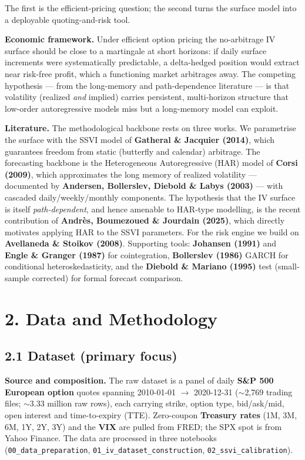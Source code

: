 \documentclass[10pt,a4paper]{article}
\begin{document}
The first is the efficient-pricing question; the second turns the surface model into a deployable quoting-and-risk tool.

\textbf{Economic framework.} Under efficient option pricing the no-arbitrage IV surface should be close to a martingale at short horizons: if daily surface increments were systematically predictable, a delta-hedged position would extract near risk-free profit, which a functioning market arbitrages away. The competing hypothesis --- from the long-memory and path-dependence literature --- is that volatility (realized \textit{and} implied) carries persistent, multi-horizon structure that low-order autoregressive models miss but a long-memory model can exploit.

\textbf{Literature.} The methodological backbone rests on three works. We parametrise the surface with the SSVI model of \textbf{Gatheral \& Jacquier (2014)}, which guarantees freedom from static (butterfly and calendar) arbitrage. The forecasting backbone is the Heterogeneous Autoregressive (HAR) model of \textbf{Corsi (2009)}, which approximates the long memory of realized volatility --- documented by \textbf{Andersen, Bollerslev, Diebold \& Labys (2003)} --- with cascaded daily/weekly/monthly components. The hypothesis that the IV surface is itself \textit{path-dependent}, and hence amenable to HAR-type modelling, is the recent contribution of \textbf{Andr\`{e}s, Boumezoued \& Jourdain (2025)}, which directly motivates applying HAR to the SSVI parameters. For the risk engine we build on \textbf{Avellaneda \& Stoikov (2008)}. Supporting tools: \textbf{Johansen (1991)} and \textbf{Engle \& Granger (1987)} for cointegration, \textbf{Bollerslev (1986)} GARCH for conditional heteroskedasticity, and the \textbf{Diebold \& Mariano (1995)} test (small-sample corrected) for formal forecast comparison.

\section*{2. Data and Methodology}

\subsection*{2.1 Dataset (primary focus)}

\textbf{Source and composition.} The raw dataset is a panel of daily \textbf{S\&P 500 European option} quotes spanning 2010-01-01 $\rightarrow$ 2020-12-31 ($\sim$2,769 trading files; $\sim$3.33 million raw rows), each carrying strike, option type, bid/ask/mid, open interest and time-to-expiry (TTE). Zero-coupon \textbf{Treasury rates} (1M, 3M, 6M, 1Y, 2Y, 3Y) and the \textbf{VIX} are pulled from FRED; the SPX spot is from Yahoo Finance. The data are processed in three notebooks (\texttt{00\_data\_preparation}, \texttt{01\_iv\_dataset\_construction}, \texttt{02\_ssvi\_calibration}).
\end{document}
